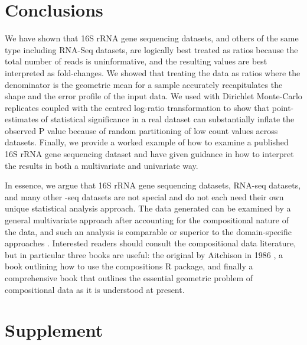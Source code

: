 \documentclass[11pt]{article}\usepackage[]{graphicx}\usepackage[]{color}
\begin{document}
\section{Conclusions}
We have shown that 16S rRNA gene sequencing datasets, and others of the same type including RNA-Seq datasets, are logically best treated as ratios because the total number of reads is uninformative, and the resulting values are best interpreted as fold-changes. We showed that treating the data as ratios where the denominator is the geometric mean for a sample accurately recapitulates the shape and the error profile of the input data. We used with Dirichlet Monte-Carlo replicates coupled with the centred log-ratio transformation to show that point-estimates of statistical significance in a real dataset can substantially inflate the observed P value because of random partitioning of low count values across datasets. Finally, we provide a worked example of how to examine a published 16S rRNA gene sequencing dataset and have given guidance in how to interpret the results in both a multivariate and univariate way.

In essence, we argue that 16S rRNA gene sequencing datasets, RNA-seq datasets, and many other -seq datasets are not special and do not each need their own unique statistical analysis approach. The data generated can be examined by a general multivariate approach after accounting for the compositional nature of the data, and such an analysis is comparable or superior to the domain-specific approaches\cite{fernandes:2014, fernandes:2014, macklaim:2013, mcmurrough:2014, Goneau:2015aa, Lovell:2015aa} . Interested readers should consult the compositional data literature, but in particular three books are useful: the original by Aitchison in 1986 \cite{Aitchison:1986}, a book outlining how to use the compositions R package\cite{van2008compositions}, and finally a comprehensive book that outlines the essential geometric problem of compositional data as it is understood at present\cite{pawlowsky2015modeling}. 




\section{Supplement}
 
\end{document}
